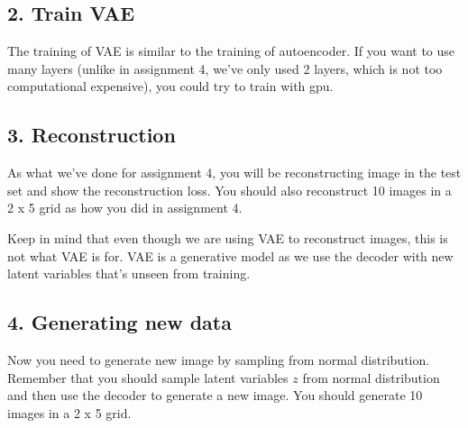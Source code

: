 \documentclass{article}
\begin{document}
\subsection*{2. Train VAE}
The training of VAE is similar to the training of autoencoder. If you want to use many layers (unlike in assignment 4, we've only used 2 layers, which is not too computational expensive), you could try to train with gpu.

\subsection*{3. Reconstruction}
As what we've done for assignment 4, you will be reconstructing image in the test set and show the reconstruction loss. You should also reconstruct 10 images in a 2 x 5 grid as how you did in assignment 4.

Keep in mind that even though we are using VAE to reconstruct images, this is not what VAE is for. VAE is a generative model as we use the decoder with new latent variables that's unseen from training.

\subsection*{4. Generating new data}
Now you need to generate new image by sampling from normal distribution. Remember that you should sample  latent variables $z$ from normal distribution and then use the decoder to generate a new image. You should generate 10 images in a 2 x 5 grid.
\end{document}
